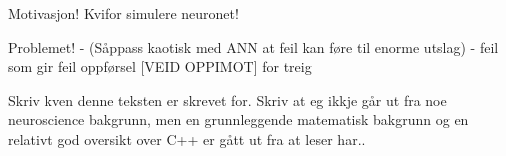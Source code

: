 


Motivasjon! Kvifor simulere neuronet!

Problemet!  - (Såppass kaotisk med ANN at feil kan føre til enorme utslag)
			- feil som gir feil oppførsel [VEID OPPIMOT]  for treig


Skriv kven denne teksten er skrevet for. Skriv at eg ikkje går ut fra noe neuroscience bakgrunn, men en grunnleggende matematisk bakgrunn og en relativt god oversikt over C++ er gått ut fra at leser har..


